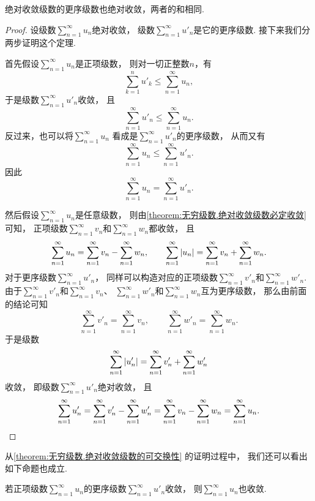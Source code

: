 \begin{theorem}[绝对收敛级数的可交换性]\label{theorem:无穷级数.绝对收敛级数的可交换性}
绝对收敛级数的更序级数也绝对收敛，两者的和相同.
\begin{proof}
设级数\(\sum_{n=1}^\infty u_n\)绝对收敛，
级数\(\sum_{n=1}^\infty u'_n\)是它的更序级数.
接下来我们分两步证明这个定理.

首先假设\(\sum_{n=1}^\infty u_n\)是正项级数，
则对一切正整数\(n\)，有\[
	\sum_{k=1}^n u'_k
	\leq \sum_{n=1}^\infty u_n,
\]
于是级数\(\sum_{n=1}^\infty u'_n\)收敛，
且\[
	\sum_{n=1}^\infty u'_n
	\leq \sum_{n=1}^\infty u_n.
\]
反过来，也可以将\(\sum_{n=1}^\infty u_n\)
看成是\(\sum_{n=1}^\infty u'_n\)的更序级数，
从而又有\[
	\sum_{n=1}^\infty u_n
	\leq \sum_{n=1}^\infty u'_n.
\]
因此\[
	\sum_{n=1}^\infty u_n
	= \sum_{n=1}^\infty u'_n.
\]

然后假设\(\sum_{n=1}^\infty u_n\)是任意级数，
则由\cref{theorem:无穷级数.绝对收敛级数必定收敛} 可知，
正项级数\(\sum_{n=1}^\infty v_n\)和\(\sum_{n=1}^\infty w_n\)都收敛，
且\[
	\sum_{n=1}^\infty u_n
	= \sum_{n=1}^\infty v_n
	- \sum_{n=1}^\infty w_n,
	\qquad
	\sum_{n=1}^\infty \abs{u_n}
	= \sum_{n=1}^\infty v_n
	+ \sum_{n=1}^\infty w_n.
\]
对于更序级数\(\sum_{n=1}^\infty u'_n\)，
同样可以构造对应的正项级数\(\sum_{n=1}^\infty v'_n\)和\(\sum_{n=1}^\infty w'_n\).
由于\(\sum_{n=1}^\infty v'_n\)和\(\sum_{n=1}^\infty v_n\)、
\(\sum_{n=1}^\infty w'_n\)和\(\sum_{n=1}^\infty w_n\)互为更序级数，
那么由前面的结论可知\[
	\sum_{n=1}^\infty v'_n
	= \sum_{n=1}^\infty v_n,
	\qquad
	\sum_{n=1}^\infty w'_n
	= \sum_{n=1}^\infty w_n.
\]
于是级数\[
	\sum_{n=1}^\infty \abs{u'_n}
	= \sum_{n=1}^\infty v'_n
	+ \sum_{n=1}^\infty w'_n
\]收敛，
即级数\(\sum_{n=1}^\infty u'_n\)绝对收敛，
且\[
	\sum_{n=1}^\infty u'_n
	= \sum_{n=1}^\infty v'_n
	- \sum_{n=1}^\infty w'_n
	= \sum_{n=1}^\infty v_n
	- \sum_{n=1}^\infty w_n
	= \sum_{n=1}^\infty u_n.
	\qedhere
\]
\end{proof}
\end{theorem}

从\cref{theorem:无穷级数.绝对收敛级数的可交换性} 的证明过程中，
我们还可以看出如下命题也成立.
\begin{proposition}
若正项级数\(\sum_{n=1}^\infty u_n\)的更序级数\(\sum_{n=1}^\infty u'_n\)收敛，
则\(\sum_{n=1}^\infty u_n\)也收敛.
\end{proposition}

